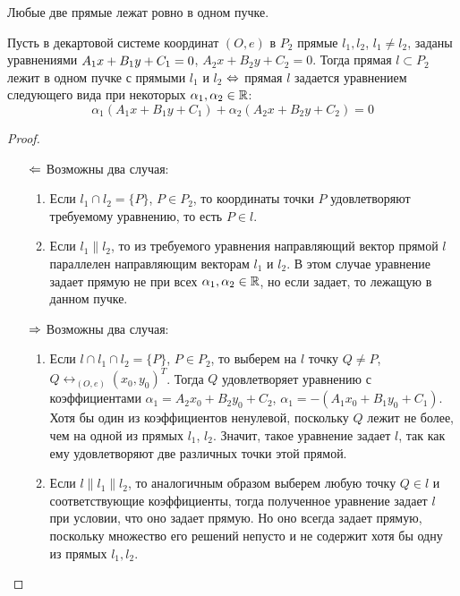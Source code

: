 \begin{note}
	Любые две прямые лежат ровно в одном пучке.
\end{note}

\begin{theorem}
	Пусть в декартовой системе координат $(O, e)$ в $P_2$ прямые $l_1, l_2$, $l_1 \ne l_2$, заданы уравнениями $A_1x\hm{+}B_1y+C_1=0$, $A_2x+B_2y+C_2=0$. Тогда прямая $l \subset P_2$ лежит в одном пучке с прямыми $l_1$ и $l_2$ $\Leftrightarrow$ прямая $l$ задается уравнением следующего вида при некоторых $\alpha_1, \alpha_2 \in \mathbb{R}$:
	\[\alpha_1(A_1x+B_1y+C_1) + \alpha_2(A_2x+B_2y+C_2) = 0\]
\end{theorem}

\begin{proof}~
	\begin{itemize}
		\item[$\Leftarrow$] Возможны два случая:
		\begin{enumerate}
			\item Если $l_1 \cap l_2 = \{P\}$, $P \in P_2$, то координаты точки $P$ удовлетворяют требуемому уравнению, то есть $P \in l$.
			\item Если $l_1 \parallel l_2$, то из требуемого уравнения направляющий вектор прямой $l$ параллелен направляющим векторам $l_1$ и $l_2$. В этом случае уравнение задает прямую не при всех $\alpha_1, \alpha_2 \in \mathbb{R}$, но если задает, то лежащую в данном пучке.
		\end{enumerate}
		
		\item[$\Rightarrow$] Возможны два случая:
		\begin{enumerate}
			\item Если $l \cap l_1 \cap l_2 = \{P\}$, $P \in P_2$, то выберем на $l$ точку $Q \ne P$, $Q \leftrightarrow_{(O, e)} (x_0, y_0)^T$. Тогда $Q$ удовлетворяет уравнению с коэффициентами $\alpha_1 = A_2x_0+B_2y_0+C_2$, $\alpha_1 = -(A_1x_0+B_1y_0+C_1)$. Хотя бы один из коэффициентов ненулевой, поскольку $Q$ лежит не более, чем на одной из прямых $l_1$, $l_2$. Значит, такое уравнение задает $l$, так как ему удовлетворяют две различных точки этой прямой.
			
			\item Если $l \parallel l_1 \parallel l_2$, то аналогичным образом выберем любую точку $Q \in l$ и соответствующие коэффициенты, тогда полученное уравнение задает $l$ при условии, что оно задает прямую. Но оно всегда задает прямую, поскольку множество его решений непусто и не содержит хотя бы одну из прямых $l_1, l_2$.\qedhere
		\end{enumerate}
	\end{itemize}
\end{proof}

